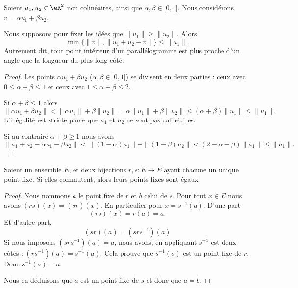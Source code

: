 \begin{lemma}        \label{LEMooEKWZooYbcGBp}
    Soient \( u_1,u_2\in \eR^2\) non colinéaires, ainsi que \( \alpha,\beta\in \mathopen[ 0 , 1 \mathclose]\). Nous considérons \( v=\alpha u_1+\beta u_2\).

    Nous supposons pour fixer les idées que \( \| u_1 \|\geq \| u_2 \|\). Alors
    \begin{equation}
        \min\{ \| v \|, \| u_1+u_2-v \| \}\leq \| u_1 \|.
    \end{equation}
    Autrement dit, tout point intérieur d'un parallélogramme est plus proche d'un angle que la longueur du plus long côté.
\end{lemma}

\begin{proof}
    Les points \( \alpha u_1+\beta u_2\) (\( \alpha,\beta\in \mathopen[ 0 , 1 \mathclose]\)) se divisent en deux parties : ceux avec \( 0\leq\alpha+\beta\leq 1\) et ceux avec \( 1\leq\alpha+\beta\leq 2\).

    Si \( \alpha+\beta\leq 1\) alors
    \begin{equation}
        \| \alpha u_1+\beta u_2 \|<\| \alpha u_1 \|+\beta\| u_2 \|= \alpha\| u_1 \|+\beta\| u_2 \|\leq (\alpha+\beta)\| u_1 \|\leq \| u_1 \|.
    \end{equation}
    L'inégalité est stricte parce que \( u_1\) et \( u_2\) ne sont pas colinéaires.

    Si au contraire \( \alpha+\beta\geq 1\) nous avons
    \begin{equation}
        \| u_1+u_2-\alpha u_1-\beta u_2 \|<\| (1-\alpha)u_1 \|+\| (1-\beta)u_2 \|<(2-\alpha-\beta)\| u_1 \|\leq \| u_1 \|.
    \end{equation}
\end{proof}

\begin{lemma}       \label{LEMooWKTGooQlfuxm}
    Soient un ensemble \( E\), et deux bijections \( r,s\colon E\to E\) ayant chacune un unique point fixe. Si elles commutent, alors leurs points fixes sont égaux. 
\end{lemma}

\begin{proof}
    Nous nommons \( a\) le point fixe de \( r\) et \( b\) celui de \( s\). Pour tout \( x\in E\) nous avons \( (rs)(x)=(sr)(x)\). En particulier pour \( x=s^{-1}(a)\). D'une part
    \begin{equation}
        (rs)(x)=r(a)=a.
    \end{equation}
    Et d'autre part,
    \begin{equation}
        (sr)(a)=(srs^{-1})(a)
    \end{equation}
    Si nous imposons \( (srs^{-1})(a)=a\), nous avons, en appliquant \( s^{-1}\) est deux côtés : \( (rs^{-1})(a)=s^{-1}(a)\). Cela prouve que \( s^{-1}(a)\) est un point fixe de \( r\). Donc \( s^{-1}(a)=a\).

    Nous en déduisons que \( a\) est un point fixe de \( s\) et donc que \( a=b\).
\end{proof}

